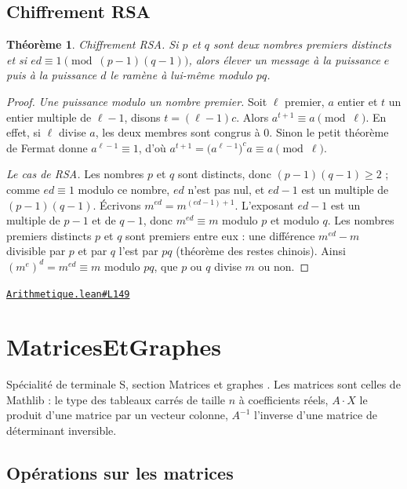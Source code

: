 \documentclass[11pt,a4paper]{article}
\theoremstyle{definition}
\theoremstyle{plain}
\newtheorem{theoreme}{Théorème}
\newcommand{\source}[2]{\par\smallskip\noindent\hfill{\footnotesize\href{#1}{\texttt{#2}}}\par\smallskip}
\begin{document}
\subsection{Chiffrement RSA}

\begin{theoreme}
\emph{Chiffrement RSA.} Si $p$ et $q$ sont deux nombres premiers distincts et si
$ed \equiv 1 \pmod{(p-1)(q-1)}$, alors élever un message à la puissance $e$ puis à la
puissance $d$ le ramène à lui-même modulo $pq$.
\end{theoreme}
\begin{proof}
\emph{Une puissance modulo un nombre premier.} Soit $\ell$ premier, $a$ entier et $t$ un
entier multiple de $\ell - 1$, disons $t = (\ell - 1)c$. Alors $a^{t+1} \equiv a \pmod{\ell}$.
En effet, si $\ell$ divise $a$, les deux membres sont congrus à $0$. Sinon le petit théorème
de Fermat donne $a^{\ell-1} \equiv 1$, d'où
$a^{t+1} = \bigl(a^{\ell-1}\bigr)^c a \equiv a \pmod{\ell}$.

\emph{Le cas de RSA.} Les nombres $p$ et $q$ sont distincts, donc $(p-1)(q-1) \ge 2$ ; comme
$ed \equiv 1$ modulo ce nombre, $ed$ n'est pas nul, et $ed - 1$ est un multiple de
$(p-1)(q-1)$. Écrivons $m^{ed} = m^{(ed - 1) + 1}$. L'exposant $ed - 1$ est un multiple de
$p - 1$ et de $q - 1$, donc $m^{ed} \equiv m$ modulo $p$ et modulo $q$. Les nombres premiers
distincts $p$ et $q$ sont premiers entre eux : une différence $m^{ed} - m$ divisible par $p$
et par $q$ l'est par $pq$ (théorème des restes chinois). Ainsi $(m^e)^d = m^{ed} \equiv m$
modulo $pq$, que $p$ ou $q$ divise $m$ ou non.
\end{proof}
\source{https://github.com/Commutator-IO/learn-lean/blob/main/courses/02-lycee/10-specialite-mathematiques-terminale-s/Arithmetique.lean\#L149}{Arithmetique.lean\#L149}

\section{MatricesEtGraphes}

\noindent
Spécialité de terminale S, section \og{} Matrices et graphes \fg{}. Les matrices sont
celles de Mathlib : le type des tableaux carrés de taille $n$ à coefficients réels,
$A \cdot X$ le produit d'une matrice par un vecteur colonne, $A^{-1}$ l'inverse d'une
matrice de déterminant inversible.

\subsection{Opérations sur les matrices}
\end{document}
